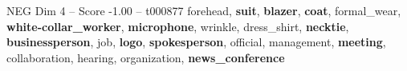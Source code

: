 \begin{textsample}{NEG Dim 4 – Score -1.00 – t000877}  \label{ex:f4_neg_004}
forehead, \textbf{suit}, \textbf{blazer}, \textbf{coat}, formal\_wear, \textbf{white-collar\_worker}, \textbf{microphone}, wrinkle, dress\_shirt, \textbf{necktie}, \textbf{businessperson}, job, \textbf{logo}, \textbf{spokesperson}, official, management, \textbf{meeting}, collaboration, hearing, organization, \textbf{news\_conference}

\end{textsample}
